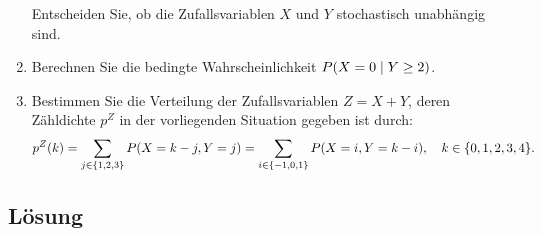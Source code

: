 \documentclass{exercise}
\begin{document}
\begin{problem}
\begin{enumerate}
            Entscheiden Sie, ob die Zufallsvariablen \(X\) und \(Y\) stochastisch unabhängig sind.
            \item Berechnen Sie die bedingte Wahrscheinlichkeit \(P\parentheses*{X = 0 \mid Y \ge 2}\).
            \item Bestimmen Sie die Verteilung der Zufallsvariablen \(Z = X + Y\), deren Zähldichte \(p^Z\) in der vorliegenden Situation gegeben ist durch:
            \[
                p^Z\parentheses*{k} = \sum_{j \in \braces*{1, 2, 3}}P\parentheses*{X = k - j, Y = j} = \sum_{i \in \braces*{-1, 0, 1}}P\parentheses*{X = i, Y = k - i}, \quad k \in \braces*{0, 1, 2, 3, 4}.
            \]
        \end{enumerate}
    \end{problem}
    
    \subsection*{Lösung}
\end{document}
